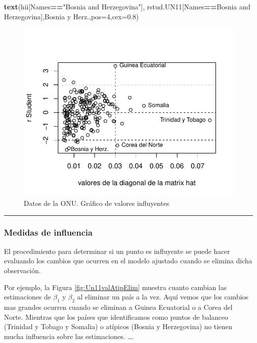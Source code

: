 \documentclass[
]{article}
\newenvironment{Shaded}{\begin{snugshade}}{\end{snugshade}}
\newcommand{\AttributeTok}[1]{\textcolor[rgb]{0.13,0.29,0.53}{#1}}
\newcommand{\DecValTok}[1]{\textcolor[rgb]{0.00,0.00,0.81}{#1}}
\newcommand{\FloatTok}[1]{\textcolor[rgb]{0.00,0.00,0.81}{#1}}
\newcommand{\FunctionTok}[1]{\textcolor[rgb]{0.13,0.29,0.53}{\textbf{#1}}}
\newcommand{\NormalTok}[1]{#1}
\newcommand{\SpecialCharTok}[1]{\textcolor[rgb]{0.81,0.36,0.00}{\textbf{#1}}}
\newcommand{\StringTok}[1]{\textcolor[rgb]{0.31,0.60,0.02}{#1}}
\begin{document}
\begin{Shaded}
\begin{Highlighting}[]
\FunctionTok{text}\NormalTok{(hii[Names}\SpecialCharTok{==}\StringTok{"Bosnia and Herzegovina"}\NormalTok{],}
\NormalTok{     rstud.UN11[Names}\SpecialCharTok{==}\StringTok{\textquotesingle{}Bosnia and Herzegovina\textquotesingle{}}\NormalTok{],}\StringTok{\textquotesingle{}Bosnia y Herz.\textquotesingle{}}\NormalTok{,}\AttributeTok{pos=}\DecValTok{4}\NormalTok{,}\AttributeTok{cex=}\FloatTok{0.8}\NormalTok{)}
\end{Highlighting}
\end{Shaded}

\begin{figure}

{\centering \includegraphics{MLG1_files/figure-latex/Un11valAtip-1} 

}

\caption{Datos de la ONU. Gráfico de valores influyentes}\label{fig:Un11valAtip}
\end{figure}
\rule{\textwidth}{0.4pt}

\hypertarget{medidas-de-influencia}{%
\subsubsection{Medidas de influencia}\label{medidas-de-influencia}}

El procedimiento para determinar si un punto es influyente se puede hacer evaluando los cambios que ocurren en el modelo ajustado cuando se elimina dicha observación.

Por ejemplo, la Figura \ref{fig:Un11valAtipElim} muestra cuanto cambian las estimaciones de \(\beta_{1}\) y \(\beta_{2}\) al eliminar un país a la vez. Aquí vemos que los cambios mas grandes ocurren cuando se eliminan a Guinea Ecuatorial o a Corea del Norte. Mientras que los países que identificamos como puntos de balanceo (Trinidad y Tobago y Somalia) o atípicos (Bosnia y Herzegovina) no tienen mucha influencia sobre las estimaciones.
\ldots.
\end{document}
